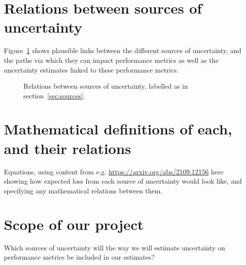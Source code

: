 \documentclass[12pt]{article} %
\begin{document}
\section{Relations between sources of uncertainty}
\label{sec:relations}

Figure~\ref{fig:relations} shows plausible links between the different sources of uncertainty, and the paths via which they can impact performance metrics as well as the uncertainty estimates linked to these performance metrics.

\begin{figure}[htb]
\centering
{}
\caption{Relations between sources of uncertainty, labelled as in section~\ref{sec:sources}.}\label{fig:relations}
\end{figure}



\section{Mathematical definitions of each, and their relations}

Equations, using content from e.g. \url{https://arxiv.org/abs/2109.12156} here showing how expected loss from each source of uncertainty would look like, and specifying any mathematical relations between them.


\section{Scope of our project}

Which sources of uncertainty will the way we will estimate uncertainty on performance metrics be included in our estimates?


 

\end{document}
